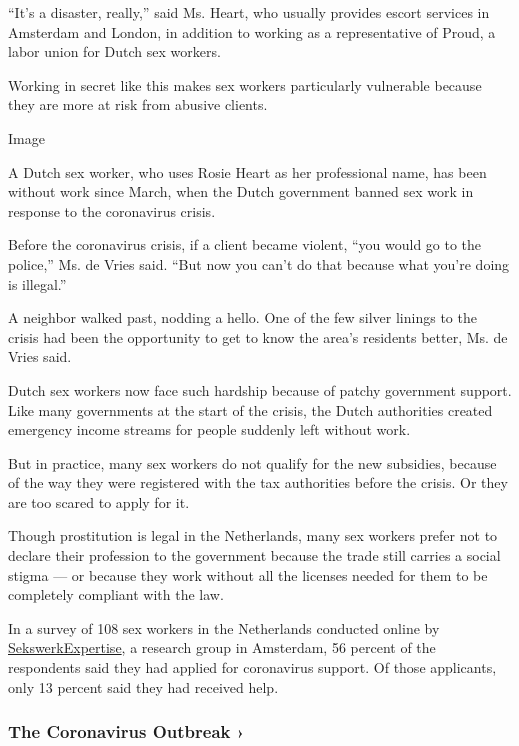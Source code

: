 ``It's a disaster, really,'' said Ms. Heart, who usually provides escort
services in Amsterdam and London, in addition to working as a
representative of Proud, a labor union for Dutch sex workers.

Working in secret like this makes sex workers particularly vulnerable
because they are more at risk from abusive clients.

Image

A Dutch sex worker, who uses Rosie Heart as her professional name, has
been without work since March, when the Dutch government banned sex work
in response to the coronavirus crisis.~

Before the coronavirus crisis, if a client became violent, ``you would
go to the police,'' Ms. de Vries said. ``But now you can't do that
because what you're doing is illegal.''

A neighbor walked past, nodding a hello. One of the few silver linings
to the crisis had been the opportunity to get to know the area's
residents better, Ms. de Vries said.

Dutch sex workers now face such hardship because of patchy government
support. Like many governments at the start of the crisis, the Dutch
authorities created emergency income streams for people suddenly left
without work.

But in practice, many sex workers do not qualify for the new subsidies,
because of the way they were registered with the tax authorities before
the crisis. Or they are too scared to apply for it.

Though prostitution is legal in the Netherlands, many sex workers prefer
not to declare their profession to the government because the trade
still carries a social stigma --- or because they work without all the
licenses needed for them to be completely compliant with the law.

In a survey of 108 sex workers in the Netherlands conducted online by
\href{https://sekswerkexpertise.nl/english/}{SekswerkExpertise}, a
research group in Amsterdam, 56 percent of the respondents said they had
applied for coronavirus support. Of those applicants, only 13 percent
said they had received help.

\href{https://www.nytimes.com/news-event/coronavirus?action=click\&pgtype=Article\&state=default\&region=MAIN_CONTENT_3\&context=storylines_faq}{}

\hypertarget{the-coronavirus-outbreak-}{%
\subsubsection{The Coronavirus Outbreak
›}\label{the-coronavirus-outbreak-}}


